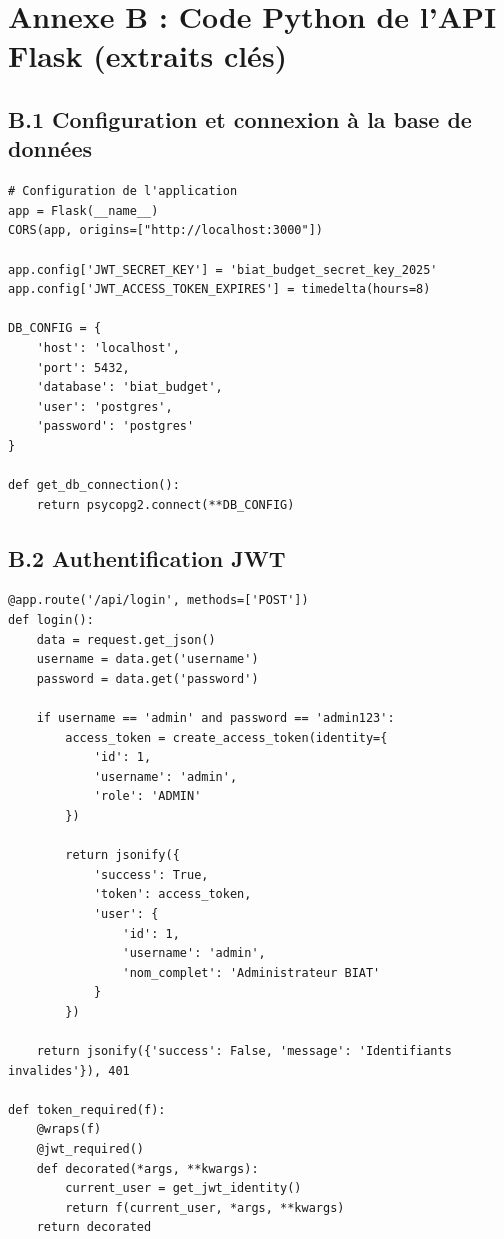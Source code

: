 \newpage

\section*{Annexe B : Code Python de l'API Flask (extraits clés)}

\subsection*{B.1 Configuration et connexion à la base de données}

\begin{verbatim}
# Configuration de l'application
app = Flask(__name__)
CORS(app, origins=["http://localhost:3000"])

app.config['JWT_SECRET_KEY'] = 'biat_budget_secret_key_2025'
app.config['JWT_ACCESS_TOKEN_EXPIRES'] = timedelta(hours=8)

DB_CONFIG = {
    'host': 'localhost',
    'port': 5432,
    'database': 'biat_budget',
    'user': 'postgres',
    'password': 'postgres'
}

def get_db_connection():
    return psycopg2.connect(**DB_CONFIG)
\end{verbatim}

\subsection*{B.2 Authentification JWT}

\begin{verbatim}
@app.route('/api/login', methods=['POST'])
def login():
    data = request.get_json()
    username = data.get('username')
    password = data.get('password')
    
    if username == 'admin' and password == 'admin123':
        access_token = create_access_token(identity={
            'id': 1,
            'username': 'admin',
            'role': 'ADMIN'
        })
        
        return jsonify({
            'success': True,
            'token': access_token,
            'user': {
                'id': 1,
                'username': 'admin',
                'nom_complet': 'Administrateur BIAT'
            }
        })
    
    return jsonify({'success': False, 'message': 'Identifiants invalides'}), 401

def token_required(f):
    @wraps(f)
    @jwt_required()
    def decorated(*args, **kwargs):
        current_user = get_jwt_identity()
        return f(current_user, *args, **kwargs)
    return decorated
\end{verbatim}


